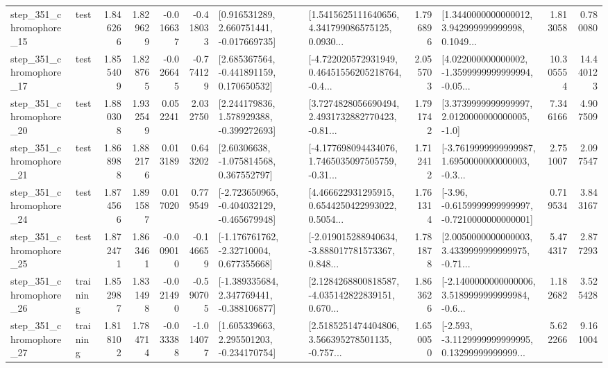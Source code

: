 \begin{tabular}{llrrrrllrlrr}
  step\_351\_chromophore\_15 &      test &      1.846266 &    1.829629 &     -0.016637 & -0.418033 &    [0.916531289, 2.660751441, -0.017669735] &  [1.5415625111640656, 4.341799086575125, 0.0930... &       1.796896 &  [1.3440000000000012, 3.942999999999998, 0.1049... &            1.813058 &          0.780080 \\
  step\_351\_chromophore\_17 &      test &      1.855409 &    1.828765 &     -0.026645 & -0.774129 &    [2.685367564, -0.441891159, 0.170650532] &  [-4.722020572931949, 0.46451556205218764, -0.4... &       2.055703 &  [4.022000000000002, -1.3599999999999994, -0.05... &           10.305554 &         14.440123 \\
  step\_351\_chromophore\_20 &      test &      1.880308 &    1.932549 &      0.052241 &  2.032750 &    [2.244179836, 1.578929388, -0.399272693] &  [3.7274828056690494, 2.4931732882770423, -0.81... &       1.791742 &     [3.3739999999999997, 2.0120000000000005, -1.0] &            7.346166 &          4.907509 \\
  step\_351\_chromophore\_21 &      test &      1.868988 &    1.882176 &      0.013189 &  0.643202 &     [2.60306638, -1.075814568, 0.367552797] &  [-4.177698094434076, 1.7465035097505759, -0.31... &       1.712412 &  [-3.7619999999999987, 1.6950000000000003, -0.3... &            2.751007 &          2.097547 \\
  step\_351\_chromophore\_24 &      test &      1.874566 &    1.891587 &      0.017020 &  0.779549 &  [-2.723650965, -0.404032129, -0.465679948] &  [4.466622931295915, 0.6544250422993022, 0.5054... &       1.761314 &  [-3.96, -0.6159999999999997, -0.7210000000000001] &            0.719534 &          3.843167 \\
  step\_351\_chromophore\_25 &      test &      1.872471 &    1.863461 &     -0.009010 & -0.146659 &    [-1.176761762, -2.32710004, 0.677355668] &  [-2.019015288940634, -3.888017781573367, 0.848... &       1.781878 &  [2.0050000000000003, 3.4339999999999975, -0.71... &            5.474317 &          2.877293 \\
  step\_351\_chromophore\_26 &  training &      1.852987 &    1.831498 &     -0.021490 & -0.590705 &   [-1.389335684, 2.347769441, -0.388106877] &  [2.1284268800818587, -4.035142822839151, 0.670... &       1.863626 &  [-2.1400000000000006, 3.5189999999999984, -0.6... &            1.182682 &          3.525428 \\
  step\_351\_chromophore\_27 &  training &      1.818102 &    1.784714 &     -0.033388 & -1.014077 &    [1.605339663, 2.295501203, -0.234170754] &  [2.5185251474404806, 3.566395278501135, -0.757... &       1.650050 &  [-2.593, -3.1129999999999995, 0.13299999999999... &            5.622266 &          9.161004 \\

\end{tabular}

